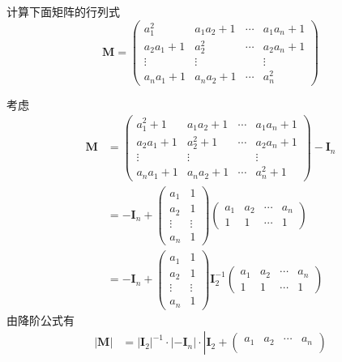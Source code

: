 \begin{brown}
\begin{example}
    计算下面矩阵的行列式
    \[
    \bm{M}=\begin{pmatrix}
        a_1^2&a_1a_2+1&\cdots&a_1a_n+1\\
        a_2a_1+1&a_2^2&\cdots&a_2a_n+1\\
        \vdots&\vdots&&\vdots\\
        a_na_1+1&a_na_2+1&\cdots&a_n^2
    \end{pmatrix}
    \]
    \begin{solution}
    考虑
    \begin{align*}
    \bm{M}&=\begin{pmatrix}
        a_1^2+1&a_1a_2+1&\cdots&a_1a_n+1\\
        a_2a_1+1&a_2^2+1&\cdots&a_2a_n+1\\
        \vdots&\vdots&&\vdots\\
        a_na_1+1&a_na_2+1&\cdots&a_n^2+1
    \end{pmatrix}-\bm{I}_n\\
    &=-\bm{I}_n+\begin{pmatrix}
        a_1&1\\
        a_2&1\\
        \vdots&\vdots\\
        a_n&1
    \end{pmatrix}\begin{pmatrix}
        a_1&a_2&\cdots&a_n\\
        1&1&\cdots&1
    \end{pmatrix}\\
    &=-\bm{I}_n+\begin{pmatrix}
        a_1&1\\
        a_2&1\\
        \vdots&\vdots\\
        a_n&1
    \end{pmatrix}
    \bm{I}_2^{-1}\begin{pmatrix}
        a_1&a_2&\cdots&a_n\\
        1&1&\cdots&1
    \end{pmatrix}
\end{align*}
由降阶公式有
\begin{align*}
    \left|\bm{M}\right|&=
    \left|\bm{I}_2\right|^{-1}\cdot 
    \left|-\bm{I}_n\right|\cdot
    \left|
        \bm{I}_2+\begin{pmatrix}
        a_1&a_2&\cdots&a_n\\

\end{pmatrix}
\end{align*}
\end{solution}
\end{example}
\end{brown}

